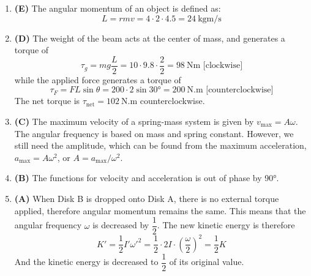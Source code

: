 \documentclass{../../oss-handout}
\begin{document}
\begin{enumerate}[leftmargin=17pt]
\item\textbf{(E)} The angular momentum of an object is defined as:
  \begin{displaymath}
    L=rmv=4\cdot2\cdot 4.5=\boxed{\SI{24}{\kilo\gram\metre\per\second}}
  \end{displaymath}
   
\item\textbf{(D)} The weight of the beam acts at the center of mass, and
  generates a torque of
  \begin{displaymath}
    \tau_g=mg\frac{L}2=10\cdot9.8\cdot\frac22=\SI{98}{\newton\metre}
    \text{ [clockwise]}
  \end{displaymath}
  while the applied force generates a torque of
  \begin{displaymath}
    \tau_F=FL\sin\theta=200\cdot2\sin\ang{30}=\SI{200}{\newton.\metre}
    \text{ [counterclockwise]}
  \end{displaymath}
  The net torque is $\boxed{\tau_\text{net}=\SI{102}{\newton.\metre}}$
  counterclockwise.

\item\textbf{(C)} The maximum velocity of a spring-mass system is given by
  $v_\text{max}=A\omega$. The angular frequency is based on mass and spring
  constant. However, we still need the amplitude, which can be found from the
  maximum acceleration, $a_\text{max}=A\omega^2$, or $A=a_\text{max}/\omega^2$.

\item\textbf{(B)} The functions for velocity and acceleration is out of phase
  by \ang{90}.
  
\item\textbf{(A)} When Disk B is dropped onto Disk A, there is no external
  torque applied, therefore angular momentum remains the same. This means that
  the angular frequency $\omega$ is decreased by $\dfrac12$. The new kinetic
  energy is therefore
  \begin{displaymath}
    K'=\frac12I'\omega'^2=\frac12\cdot2I\cdot\left(\frac{\omega}2\right)^2
    =\frac12K
  \end{displaymath}
  And the kinetic energy is decreased to $\dfrac12$ of its original value.
\end{enumerate}
\end{document}
